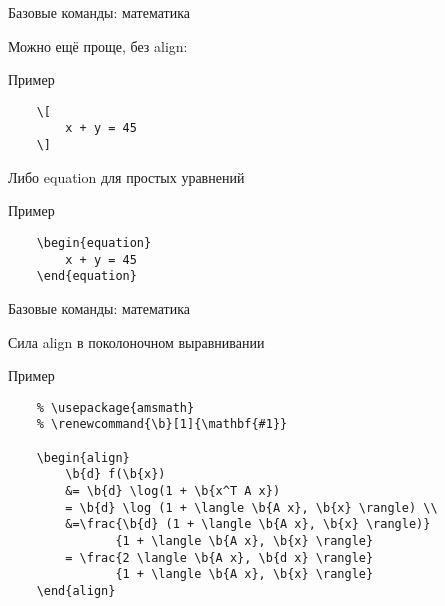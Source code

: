 \begin{frame}[fragile]{Базовые команды: математика}

Можно ещё проще, без align:

\begin{block}{Пример}
    \begin{lstlisting}
    \[
        x + y = 45
    \]
    \end{lstlisting}
\end{block}

Либо equation для простых уравнений

\begin{block}{Пример}
    \begin{lstlisting}
    \begin{equation}
        x + y = 45
    \end{equation}
    \end{lstlisting}
\end{block}

\end{frame}


\begin{frame}[fragile]{Базовые команды: математика}

Сила align в поколоночном выравнивании

\begin{block}{Пример}
    \begin{lstlisting}
    % \usepackage{amsmath}
    % \renewcommand{\b}[1]{\mathbf{#1}}

    \begin{align}
        \b{d} f(\b{x}) 
        &= \b{d} \log(1 + \b{x^T A x}) 
        = \b{d} \log (1 + \langle \b{A x}, \b{x} \rangle) \\
        &=\frac{\b{d} (1 + \langle \b{A x}, \b{x} \rangle)}
               {1 + \langle \b{A x}, \b{x} \rangle}
        = \frac{2 \langle \b{A x}, \b{d x} \rangle}
               {1 + \langle \b{A x}, \b{x} \rangle}
    \end{align}
    \end{lstlisting}
\end{block}

\end{frame}


